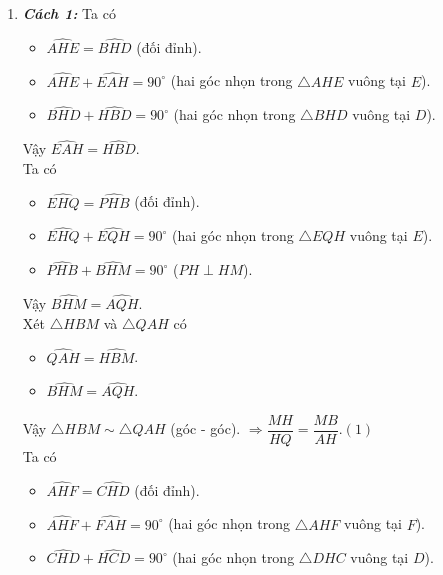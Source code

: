 \begin{ex}
{\begin{enumerate}
			Xét $\triangle HEF$ và $\triangle HCB$ có
			\begin{itemize}
				\item $\widehat{EHF}=\widehat{CHB}$. (đối đỉnh)
				\item $\dfrac{HF}{HB}=\dfrac{HE}{HC}$. (chứng minh trên)
			\end{itemize}
			Vậy $\triangle EHF\sim\triangle CHB$ (cạnh - góc - cạnh).\\
			Vậy $\widehat{FEH}=\widehat{CH}$ (hai góc tương ứng) $\Rightarrow \widehat{FEB}=\widehat{FCB}$.
			\item 
			\textbf{\textit{Cách 1:}} 
			Ta có
			\begin{itemize}
				\item $\widehat{AHE}=\widehat{BHD}$ (đối đỉnh).
				\item $\widehat{AHE}+\widehat{EAH}=90^\circ$ (hai góc nhọn trong $\triangle AHE$ vuông tại $E$).
				\item $\widehat{BHD}+\widehat{HBD}=90^\circ$ (hai góc nhọn trong $\triangle BHD$ vuông tại $D$).
			\end{itemize}
			Vậy $\widehat{EAH}=\widehat{HBD}$.\\
			Ta có
			\begin{itemize}
				\item $\widehat{EHQ}=\widehat{PHB}$ (đối đỉnh).
				\item $\widehat{EHQ}+\widehat{EQH}=90^\circ$ (hai góc nhọn trong $\triangle EQH$ vuông tại $E$).
				\item $\widehat{PHB}+\widehat{BHM}=90^\circ$ ($PH\perp HM$).
			\end{itemize}
			Vậy $\widehat{BHM}=\widehat{AQH}$.\\
			Xét $\triangle HBM$ và $\triangle QAH$ có
			\begin{itemize}
				\item $\widehat{QAH}=\widehat{HBM}$.
				\item $\widehat{BHM}=\widehat{AQH}$.
			\end{itemize}
			Vậy $\triangle HBM\sim\triangle QAH$ (góc - góc). $\Rightarrow \dfrac{MH}{HQ}=\dfrac{MB}{AH}$.\hfill$(1)$\\
			Ta có
			\begin{itemize}
				\item $\widehat{AHF}=\widehat{CHD}$ (đối đỉnh).
				\item $\widehat{AHF}+\widehat{FAH}=90^\circ$ (hai góc nhọn trong $\triangle AHF$ vuông tại $F$).
				\item $\widehat{CHD}+\widehat{HCD}=90^\circ$ (hai góc nhọn trong $\triangle DHC$ vuông tại $D$).

\end{itemize}
\end{enumerate}}
\end{ex}
